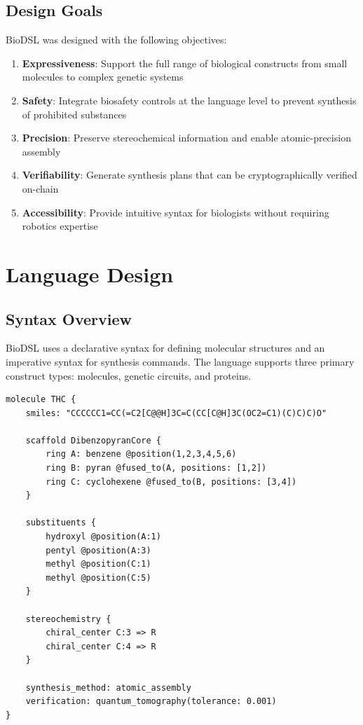 \documentclass[12pt,a4paper]{article}
\begin{document}
\subsection{Design Goals}

BioDSL was designed with the following objectives:

\begin{enumerate}
    \item \textbf{Expressiveness}: Support the full range of biological constructs from small molecules to complex genetic systems
    \item \textbf{Safety}: Integrate biosafety controls at the language level to prevent synthesis of prohibited substances
    \item \textbf{Precision}: Preserve stereochemical information and enable atomic-precision assembly
    \item \textbf{Verifiability}: Generate synthesis plans that can be cryptographically verified on-chain
    \item \textbf{Accessibility}: Provide intuitive syntax for biologists without requiring robotics expertise
\end{enumerate}

\section{Language Design}

\subsection{Syntax Overview}

BioDSL uses a declarative syntax for defining molecular structures and an imperative syntax for synthesis commands. The language supports three primary construct types: molecules, genetic circuits, and proteins.

\begin{lstlisting}[style=biodsl,caption={BioDSL molecule definition with stereochemistry}]
molecule THC {
    smiles: "CCCCCC1=CC(=C2[C@@H]3C=C(CC[C@H]3C(OC2=C1)(C)C)C)O"

    scaffold DibenzopyranCore {
        ring A: benzene @position(1,2,3,4,5,6)
        ring B: pyran @fused_to(A, positions: [1,2])
        ring C: cyclohexene @fused_to(B, positions: [3,4])
    }

    substituents {
        hydroxyl @position(A:1)
        pentyl @position(A:3)
        methyl @position(C:1)
        methyl @position(C:5)
    }

    stereochemistry {
        chiral_center C:3 => R
        chiral_center C:4 => R
    }

    synthesis_method: atomic_assembly
    verification: quantum_tomography(tolerance: 0.001)
}
\end{lstlisting}
\end{document}
